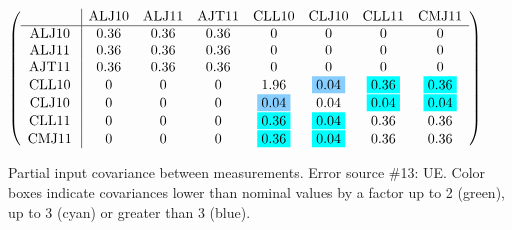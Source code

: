 \begin{table}[H]
\scriptsize
\begin{center}
\renewcommand{\arraystretch}{1.1}
\begin{math}\left(\begin{array}{c|ccccccc}
 & \mathrm{ALJ10} & 
\mathrm{ALJ11} & 
\mathrm{AJT11} & 
\mathrm{CLL10} & 
\mathrm{CLJ10} & 
\mathrm{CLL11} & 
\mathrm{CMJ11} \\
\hline
\mathrm{ALJ10} \hspace*{2pt} &       0.36 &       0.36 &       0.36 &  0 &  0 &  0 &  0 \\
\mathrm{ALJ11} \hspace*{2pt} &       0.36 &       0.36 &       0.36 &  0 &  0 &  0 &  0 \\
\mathrm{AJT11} \hspace*{2pt} &       0.36 &       0.36 &       0.36 &  0 &  0 &  0 &  0 \\
\mathrm{CLL10} \hspace*{2pt} &  0 &  0 &  0 &       1.96 &  \colorbox{SkyBlue1}{$      0.04$} &  \colorbox{Cyan1}{$      0.36$} &  \colorbox{Cyan1}{$      0.36$} \\
\mathrm{CLJ10} \hspace*{2pt} &  0 &  0 &  0 &  \colorbox{SkyBlue1}{$      0.04$} &       0.04 &  \colorbox{Cyan1}{$      0.04$} &  \colorbox{Cyan1}{$      0.04$} \\
\mathrm{CLL11} \hspace*{2pt} &  0 &  0 &  0 &  \colorbox{Cyan1}{$      0.36$} &  \colorbox{Cyan1}{$      0.04$} &       0.36 &       0.36 \\
\mathrm{CMJ11} \hspace*{2pt} &  0 &  0 &  0 &  \colorbox{Cyan1}{$      0.36$} &  \colorbox{Cyan1}{$      0.04$} &       0.36 &       0.36 \\
\end{array}\right)\end{math}
\caption{Partial input covariance between measurements. Error source \#13: UE. Color boxes indicate covariances lower than nominal values by a factor up to 2 (green), up to 3 (cyan) or greater than 3 (blue).}
\renewcommand{\arraystretch}{1}
\end{center}
\end{table}
